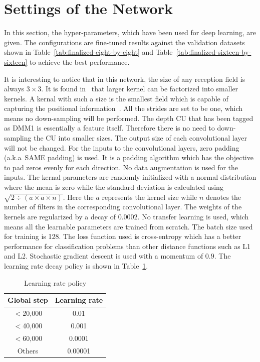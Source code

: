 \section{Settings of the Network}\label{sec:config}
In this section, the hyper-parameters, which have been
used for deep learning, are given.
The configurations are fine-tuned results against the validation
datasets shown in Table~\ref{tab:finalized-eight-by-eight}
and Table~\ref{tab:finalized-sixteen-by-sixteen} to achieve the
best performance.

It is interesting to notice that in this network, 
the size of any reception field
is always \(3\times3\).
It is found in~\parencite{RN62} that
larger kernel can be factorized into smaller kernels.
A kernal with such a size is the smallest
field which is capable of capturing the positional
information~\parencite{RN107}.
All the strides are set to be one, which means
no down-sampling will be performed.
The depth CU that has been tagged as DMM1 is essentially
a feature itself.
Therefore there is no need to down-sampling
the CU into smaller sizes.
The output size of each convolutional layer
will not be changed.
For the inputs to the convolutional layers, 
zero padding (a.k.a\ SAME padding) is used.
It is a padding algorithm which has the objective
to pad zeros evenly for each direction.
No data augmentation is used for the inputs.
The kernal parameters are randomly initialized 
with a normal distribution where the mean 
is zero while the standard deviation is 
calculated using 
\(\sqrt{2\div(\mathit{a}\times\mathit{a}\times\mathit{n})}\).
Here the \(\mathit{a}\) represents the kernel size
while \(\mathit{n}\) denotes the number of filters
in the corresponding convolutional layer.
The weights of the kernels are regularized by
a decay of \(0.0002\).
No transfer learning is used, which means all the learnable 
parameters are trained from scratch.
The batch size used for training is 128.
The loss function used is cross-entropy which has
a better performance for classification problems 
than other distance functions such as L1 and L2.
Stochastic gradient descent is used with a momentum 
of \(0.9\).
The learning rate decay policy is shown in 
Table~\ref{tab:lr-policy}.

\begin{table}[H]
    \caption{Learning rate policy}
    \bigskip\label{tab:lr-policy}
    \centering
    \begin{tabular}{c c}
        \toprule
        Global step & Learning rate \\
        \midrule
        \(<\)20,000 & 0.01 \\
        \(<\)40,000 & 0.001 \\
        \(<\)60,000 & 0.0001 \\
        Others  & 0.00001 \\
        \bottomrule
    \end{tabular}
\end{table}

